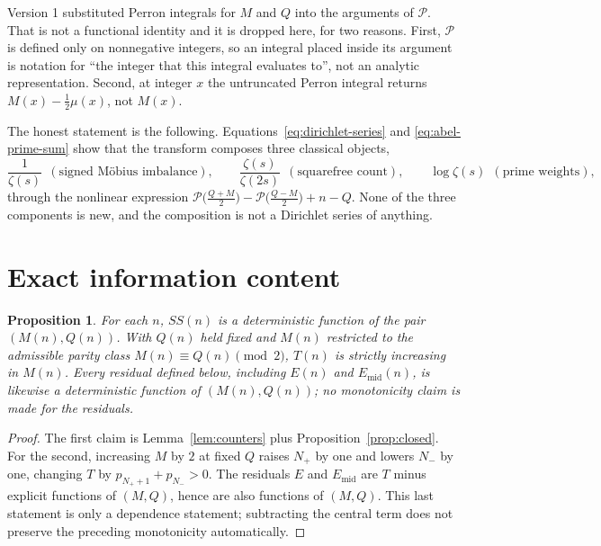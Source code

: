 \documentclass[11pt]{amsart}
\numberwithin{equation}{section}
\theoremstyle{plain}
\newtheorem{proposition}[theorem]{Proposition}
\theoremstyle{definition}
\theoremstyle{remark}
\newcommand{\mob}{\mu}
\newcommand{\Mert}{M}
\newcommand{\Sq}{Q}
\newcommand{\PS}{\mathcal P}
\begin{document}
Version 1 substituted Perron integrals for $\Mert$ and $\Sq$ into the arguments
of $\PS$. That is not a functional identity and it is dropped here, for two
reasons. First, $\PS$ is defined only on nonnegative integers, so an integral
placed inside its argument is notation for ``the integer that this integral
evaluates to'', not an analytic representation. Second, at integer $x$ the
untruncated Perron integral returns $\Mert(x)-\tfrac12\mob(x)$, not $\Mert(x)$.

The honest statement is the following. Equations~\eqref{eq:dirichlet-series} and
\eqref{eq:abel-prime-sum} show that the transform composes three classical objects,
\begin{equation}
\label{eq:zeta-components}
\frac1{\zeta(s)}\ \ (\text{signed M\"obius imbalance}),
\qquad
\frac{\zeta(s)}{\zeta(2s)}\ \ (\text{squarefree count}),
\qquad
\log\zeta(s)\ \ (\text{prime weights}),
\end{equation}
through the nonlinear expression
$\PS\bigl(\tfrac{\Sq+\Mert}2\bigr)-\PS\bigl(\tfrac{\Sq-\Mert}2\bigr)+n-\Sq$.
None of the three components is new, and the composition is not a Dirichlet
series of anything.

\section{Exact information content}
\label{sec:information}

\begin{proposition}\label{prop:info}
For each $n$, $SS(n)$ is a deterministic function of the pair
$(\Mert(n),\Sq(n))$. With $\Sq(n)$ held fixed and $\Mert(n)$ restricted to the
admissible parity class $\Mert(n)\equiv\Sq(n)\pmod 2$, $T(n)$ is strictly
increasing in $\Mert(n)$. Every residual defined below, including $E(n)$ and
$E_{\mathrm{mid}}(n)$, is likewise a deterministic function of
$(\Mert(n),\Sq(n))$; no monotonicity claim is made for the residuals.
\end{proposition}

\begin{proof}
The first claim is Lemma~\ref{lem:counters} plus
Proposition~\ref{prop:closed}. For the second, increasing $\Mert$ by $2$ at
fixed $\Sq$ raises $N_+$ by one and lowers $N_-$ by one, changing $T$ by
$p_{N_++1}+p_{N_-}>0$. The residuals $E$ and $E_{\mathrm{mid}}$ are $T$ minus explicit functions of
$(\Mert,\Sq)$, hence are also functions of $(\Mert,\Sq)$. This last statement
is only a dependence statement; subtracting the central term does not preserve the
preceding monotonicity automatically.
\end{proof}
\end{document}
